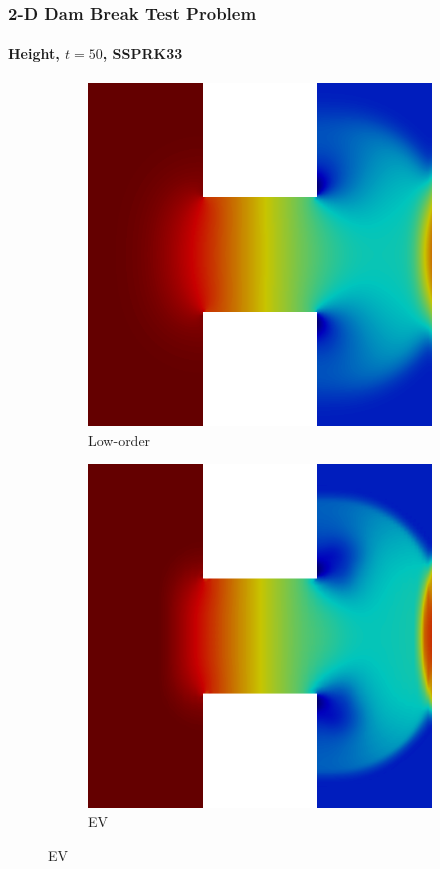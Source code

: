 \begin{frame}
\frametitle{2-D Dam Break Test Problem}
\framesubtitle{Height, $t=50$, SSPRK33}

\begin{figure}[h]
   \centering
   \begin{subfigure}{0.49\textwidth}
      \centering
      \includegraphics[width=\textwidth]{./figures/dambreak2d_height_Low.png}
      \caption{Low-order}
   \end{subfigure}
   \begin{subfigure}{0.49\textwidth}
      \centering
      \includegraphics[width=\textwidth]{./figures/dambreak2d_height_EV.png}
      \caption{EV}
   \end{subfigure}
\end{figure}

\end{frame}
